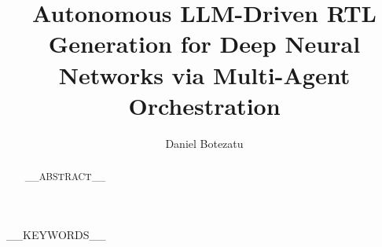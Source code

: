 \documentclass[sigconf]{acmart}
\begin{document}
\title[Autonomous LLM-Driven RTL Generation for DNNs]{Autonomous LLM-Driven RTL Generation for Deep Neural Networks via Multi-Agent Orchestration}

\author{Daniel Botezatu}
\renewcommand{\shortauthors}{Botezatu}

\begin{abstract}
__ABSTRACT__
\end{abstract}

__KEYWORDS__

\maketitle
\end{document}
